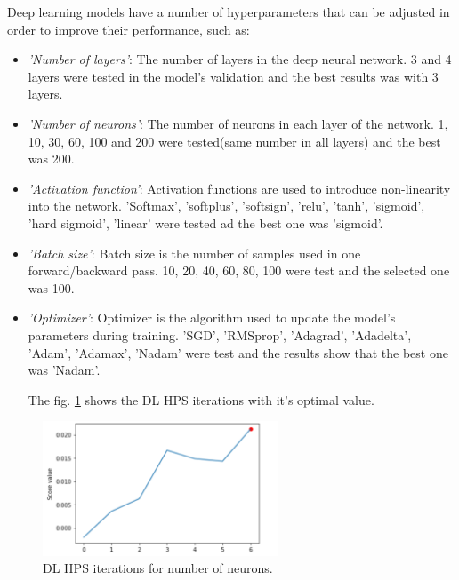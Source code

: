 \documentclass[journal]{IEEEtran} %
\begin{document}
Deep learning models have a number of hyperparameters that can be adjusted in order to improve their performance, such as:

\begin{itemize}
  \item \textit{'Number of layers'}: The number of layers in the deep neural network. 3 and 4 layers were tested in the model's validation and the best results was with 3 layers. 
  \item \textit{'Number of neurons'}: The number of neurons in each layer of the network. 1, 10, 30, 60, 100 and 200 were tested(same number in all layers) and the best was 200.
  \item \textit{'Activation function'}: Activation functions are used to introduce non-linearity into the network. 'Softmax', 'softplus', 'softsign', 'relu', 'tanh', 'sigmoid', 'hard sigmoid', 'linear' were tested ad the best one was 'sigmoid'.
  \item \textit{'Batch size'}: Batch size is the number of samples used in one forward/backward pass. 10, 20, 40, 60, 80, 100 were test and the selected one was 100.
  \item \textit{'Optimizer'}: Optimizer is the algorithm used to update the model's parameters during training. 'SGD', 'RMSprop', 'Adagrad', 'Adadelta', 'Adam', 'Adamax', 'Nadam' were test and the results show that the best one was 'Nadam'.

  The fig. \ref{fig:dl_h} shows the DL HPS iterations with it's optimal value.
  
\end{itemize}

\begin{figure}[htp]
    \centering
    \includegraphics[width=7cm]{Project2-Report_FAA/figures/dl_hyper.png}
    \caption{DL HPS iterations for number of neurons.}
    \label{fig:dl_h}
\end{figure}
\end{document}
